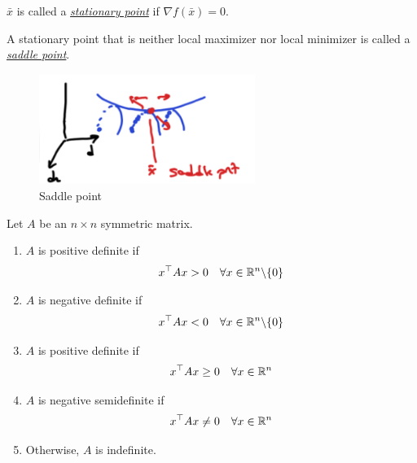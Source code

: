 \documentclass[11pt]{article}
\numberwithin{equation}{section}
\begin{document}
\begin{definition}
    $\bar{x}$ is called a \underline{\textit{stationary point}} if $\nabla f(\bar{x})=0$.
\end{definition}

\begin{definition}
    A stationary point that is neither local maximizer nor local minimizer is called a \underline{\textit{saddle point}}.
\end{definition}

\begin{figure}[H]
    \centering
    \includegraphics[width = 7cm]{images/9-ex-4.png}
    \caption{Saddle point}
\end{figure}

\begin{definition}
    Let $A$ be an $n \times n$ symmetric matrix. \begin{enumerate}
        \item $A$ is positive definite if \begin{align*}
            x^\top A x > 0 \quad \forall x \in \mathbb R^n \backslash \{0\}
        \end{align*}
        \item $A$ is negative definite if \begin{align*}
            x^\top A x < 0 \quad \forall x \in \mathbb R^n \backslash \{0\}
        \end{align*}
        \item $A$ is positive definite if \begin{align*}
            x^\top A x \geq 0 \quad \forall x \in \mathbb R^n
        \end{align*}
        \item $A$ is negative semidefinite if \begin{align*}
            x^\top A x \neq 0 \quad \forall x \in \mathbb R^n
        \end{align*}
        \item Otherwise, $A$ is indefinite.
    \end{enumerate}
\end{definition}
\end{document}

